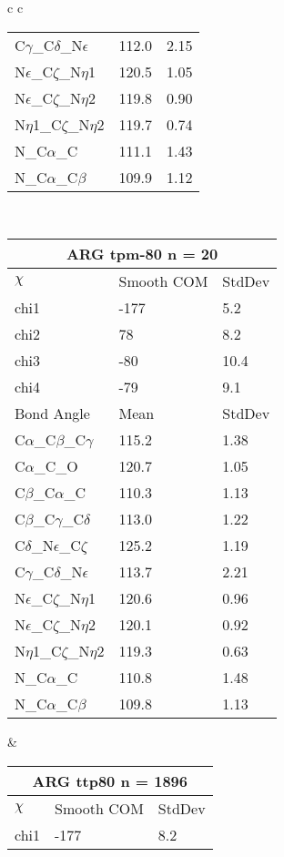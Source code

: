 \begin{longtable}{ c c }
\begin{tabular}{ l l l }
  C$\gamma$\_C$\delta$\_N$\epsilon$ & 112.0 & 2.15\\
  N$\epsilon$\_C$\zeta$\_N$\eta$1 & 120.5 & 1.05\\
  N$\epsilon$\_C$\zeta$\_N$\eta$2 & 119.8 & 0.90\\
  N$\eta$1\_C$\zeta$\_N$\eta$2 & 119.7 & 0.74\\
  N\_C$\alpha$\_C & 111.1 & 1.43\\
  N\_C$\alpha$\_C$\beta$ & 109.9 & 1.12\\
  \bottomrule
  \end{tabular}
  \\
  \begin{tabular}{ l l l }
  \toprule
  \multicolumn{3}{c}{ARG \textbf{tpm-80} n = 20} \\ \toprule
  $\chi$       & Smooth COM & StdDev \\ \midrule
  chi1 & -177 & 5.2 \\ 
  chi2 & 78 & 8.2 \\ 
  chi3 & -80 & 10.4 \\ 
  chi4 & -79 & 9.1 \\ \midrule
  Bond Angle   & Mean     & StdDev \\ \midrule
  C$\alpha$\_C$\beta$\_C$\gamma$ & 115.2 & 1.38\\
  C$\alpha$\_C\_O & 120.7 & 1.05\\
  C$\beta$\_C$\alpha$\_C & 110.3 & 1.13\\
  C$\beta$\_C$\gamma$\_C$\delta$ & 113.0 & 1.22\\
  C$\delta$\_N$\epsilon$\_C$\zeta$ & 125.2 & 1.19\\
  C$\gamma$\_C$\delta$\_N$\epsilon$ & 113.7 & 2.21\\
  N$\epsilon$\_C$\zeta$\_N$\eta$1 & 120.6 & 0.96\\
  N$\epsilon$\_C$\zeta$\_N$\eta$2 & 120.1 & 0.92\\
  N$\eta$1\_C$\zeta$\_N$\eta$2 & 119.3 & 0.63\\
  N\_C$\alpha$\_C & 110.8 & 1.48\\
  N\_C$\alpha$\_C$\beta$ & 109.8 & 1.13\\
  \bottomrule
  \end{tabular}
  &
  \begin{tabular}{ l l l }
  \toprule
  \multicolumn{3}{c}{ARG \textbf{ttp80} n = 1896} \\ \toprule
  $\chi$       & Smooth COM & StdDev \\ \midrule
  chi1 & -177 & 8.2 \\ 

\end{tabular}
\end{longtable}
